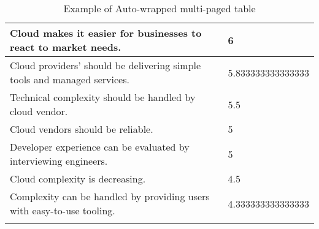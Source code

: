 \begin{longtable}{|p{10cm}|p{2cm}|}
Cloud makes it easier for businesses to react to market needs. & 6 \\ \hline
Cloud providers' should be delivering simple tools and managed services. & 5.833333333333333 \\ \hline
Technical complexity should be handled by cloud vendor. & 5.5 \\ \hline
Cloud vendors should be reliable. & 5 \\ \hline
Developer experience can be evaluated by interviewing engineers. & 5 \\ \hline
Cloud complexity is decreasing. & 4.5 \\ \hline
Complexity can be handled by providing users with easy-to-use tooling. & 4.333333333333333 \\ \hline
\caption{Example of Auto-wrapped multi-paged table}
\label{tab:table1}
\end{longtable}
